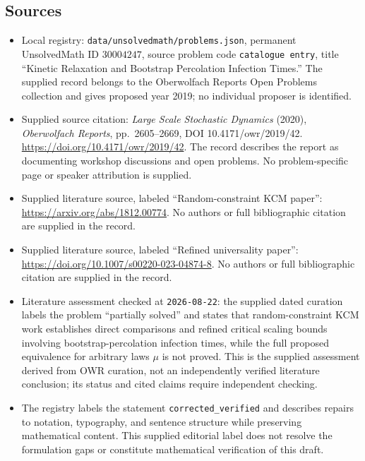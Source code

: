 \documentclass[11pt]{article}
\begin{document}
\subsection{Sources}
\begin{itemize}
\item Local registry: \texttt{data/unsolvedmath/problems.json}, permanent UnsolvedMath ID \(30004247\), source problem code \texttt{catalogue entry}, title ``Kinetic Relaxation and Bootstrap Percolation Infection Times.'' The supplied record belongs to the Oberwolfach Reports Open Problems collection and gives proposed year 2019; no individual proposer is identified.
\item Supplied source citation: \emph{Large Scale Stochastic Dynamics} (2020), \emph{Oberwolfach Reports}, pp.~2605--2669, DOI 10.4171/owr/2019/42. \url{https://doi.org/10.4171/owr/2019/42}. The record describes the report as documenting workshop discussions and open problems. No problem-specific page or speaker attribution is supplied.
\item Supplied literature source, labeled ``Random-constraint KCM paper'': \url{https://arxiv.org/abs/1812.00774}. No authors or full bibliographic citation are supplied in the record.
\item Supplied literature source, labeled ``Refined universality paper'': \url{https://doi.org/10.1007/s00220-023-04874-8}. No authors or full bibliographic citation are supplied in the record.
\item Literature assessment checked at \texttt{2026-08-22}: the supplied dated curation labels the problem ``partially solved'' and states that random-constraint KCM work establishes direct comparisons and refined critical scaling bounds involving bootstrap-percolation infection times, while the full proposed equivalence for arbitrary laws \(\mu\) is not proved. This is the supplied assessment derived from OWR curation, not an independently verified literature conclusion; its status and cited claims require independent checking.
\item The registry labels the statement \texttt{corrected\_verified} and describes repairs to notation, typography, and sentence structure while preserving mathematical content. This supplied editorial label does not resolve the formulation gaps or constitute mathematical verification of this draft.
\end{itemize}
\end{document}
